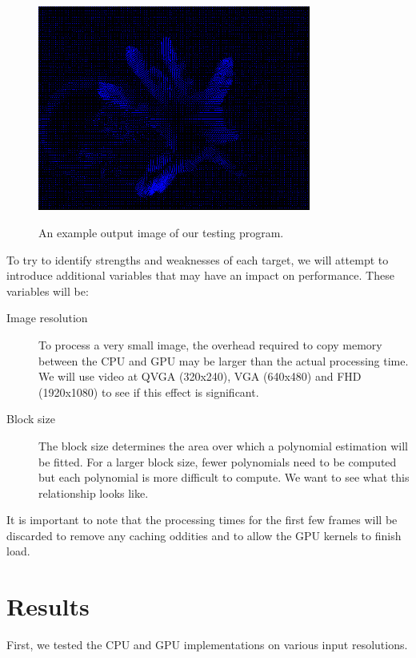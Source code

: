 \documentclass[12pt,letterpaper]{article}
\begin{document}
\begin{figure}[h]
  \centering
  \includegraphics[width=0.8\textwidth]{flow.png}
  \label{fig:flow}
  \caption{An example output image of our testing program.}
\end{figure}

To try to identify strengths and weaknesses of each target, we will attempt to
introduce additional variables that may have an impact on performance. These
variables will be:

\begin{description}
  \item[Image resolution] To process a very small image, the overhead required
    to copy memory between the CPU and GPU may be larger than the actual
    processing time. We will use video at QVGA (320x240), VGA (640x480) and FHD
    (1920x1080) to see if this effect is significant.
  \item[Block size] The block size determines the area over which a polynomial
    estimation will be fitted. For a larger block size, fewer polynomials need
    to be computed but each polynomial is more difficult to compute. We want to
    see what this relationship looks like.
\end{description}

It is important to note that the processing times for the first few frames will
be discarded to remove any caching oddities and to allow the GPU kernels to
finish load.

\section{Results}

First, we tested the CPU and GPU implementations on various input resolutions.
\end{document}
